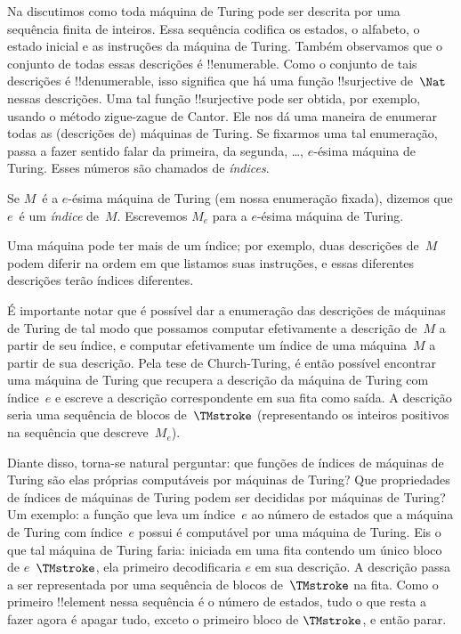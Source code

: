 \documentclass[../../../include/open-logic-section]{subfiles}
\begin{document}

Na  discutimos como toda máquina de Turing pode ser
descrita por uma sequência finita de inteiros. Essa sequência codifica
os estados, o alfabeto, o estado inicial e as instruções da máquina de
Turing. Também observamos que o conjunto de todas essas descrições é
!!{enumerable}. Como o conjunto de tais descrições é !!{denumerable},
isso significa que há uma função !!{surjective} de~$\Nat$ nessas
descrições. Uma tal função !!{surjective} pode ser obtida, por exemplo,
usando o método zigue-zague de Cantor. Ele nos dá uma maneira de
enumerar todas as (descrições de) máquinas de Turing. Se fixarmos uma
tal enumeração, passa a fazer sentido falar da primeira, da segunda,
\dots, $e$-ésima máquina de Turing. Esses números são chamados de
\emph{índices}.

\begin{defn}
Se $M$~é a $e$-ésima máquina de Turing (em nossa enumeração fixada),
dizemos que $e$~é um \emph{índice} de~$M$. Escrevemos $M_e$ para a
$e$-ésima máquina de Turing.
\end{defn}

Uma máquina pode ter mais de um índice; por exemplo, duas descrições
de~$M$ podem diferir na ordem em que listamos suas instruções, e essas
diferentes descrições terão índices diferentes.

É importante notar que é possível dar a enumeração das descrições de
máquinas de Turing de tal modo que possamos computar efetivamente a
descrição de~$M$ a partir de seu índice, e computar efetivamente um
índice de uma máquina~$M$ a partir de sua descrição. Pela tese de
Church-Turing, é então possível encontrar uma máquina de Turing que
recupera a descrição da máquina de Turing com índice~$e$ e escreve a
descrição correspondente em sua fita como saída. A descrição seria uma
sequência de blocos de~$\TMstroke$ (representando os inteiros positivos
na sequência que descreve~$M_e$).

Diante disso, torna-se natural perguntar: que funções de índices de
máquinas de Turing são elas próprias computáveis por máquinas de
Turing? Que propriedades de índices de máquinas de Turing podem ser
decididas por máquinas de Turing? Um exemplo: a função que leva um
índice~$e$ ao número de estados que a máquina de Turing com índice~$e$
possui é computável por uma máquina de Turing. Eis o que tal máquina
de Turing faria: iniciada em uma fita contendo um único bloco de
$e$~$\TMstroke$, ela primeiro decodificaria $e$ em sua descrição. A
descrição passa a ser representada por uma sequência de blocos
de~$\TMstroke$ na fita. Como o primeiro !!{element} nessa sequência é
o número de estados, tudo o que resta a fazer agora é apagar tudo,
exceto o primeiro bloco de $\TMstroke$, e então parar.
\end{document}
